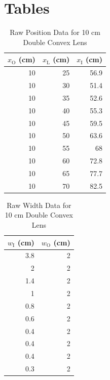 \section{Tables}
%
\begin{table}[ht]
    \centering
    \begin{tabular}{r|r|r}
        $x_{\text{O}}$ (cm) & $x_{\text{L}}$ (cm) & $x_{\text{I}}$ (cm) \\
        \hline
        10 & 25 & 56.9 \\
        10 & 30 & 51.4 \\
        10 & 35 & 52.6 \\
        10 & 40 & 55.3 \\
        10 & 45 & 59.5 \\
        10 & 50 & 63.6 \\
        10 & 55 & 68 \\
        10 & 60 & 72.8 \\
        10 & 65 & 77.7 \\
        10 & 70 & 82.5 \\
        \hline
        \end{tabular}
    \caption{Raw Position Data for 10 cm Double Convex Lens}
    \label{table.08.position.10cm}
\end{table}
%
\begin{table}[ht]
    \centering
    \begin{tabular}{r|r}
        $w_{\text{I}}$ (cm) & $w_{\text{O}}$ (cm) \\
        \hline
        3.8 & 2 \\
        2 & 2 \\
        1.4 & 2 \\
        1 & 2 \\
        0.8 & 2 \\
        0.6 & 2 \\
        0.4 & 2 \\
        0.4 & 2 \\
        0.4 & 2 \\
        0.3 & 2 \\
        \hline
    \end{tabular}
    \caption{Raw Width Data for 10 cm Double Convex Lens}
    \label{table.08.width.10cm}
\end{table}
%
